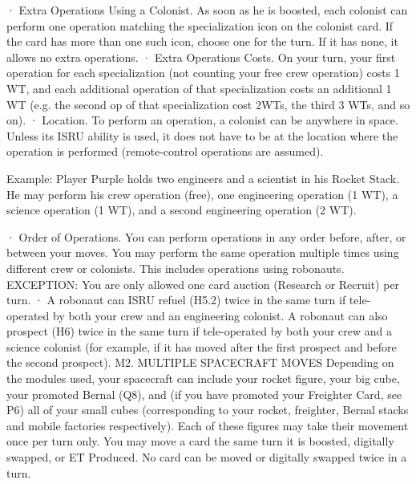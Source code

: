 \documentclass[a4paper]{book}
\begin{document}
·       Extra Operations Using a Colonist. As soon as he is boosted, each colonist can perform one operation matching the specialization icon on the colonist card. If the card has more than one such icon, choose one for the turn. If it has none, it allows no extra operations.
·       Extra Operations Costs. On your turn, your first operation for each specialization (not counting your free crew operation) costs 1 WT, and each additional operation of that specialization costs an additional 1 WT (e.g. the second op of that specialization cost 2WTs, the third 3 WTs, and so on).
·       Location. To perform an operation, a colonist can be anywhere in space. Unless its ISRU ability is used, it does not have to be at the location where the operation is performed (remote-control operations are assumed).

Example: Player Purple holds two engineers and a scientist in his Rocket Stack. He may perform his crew operation (free), one engineering operation (1 WT), a science operation (1 WT), and a second engineering operation (2 WT).

·       Order of Operations. You can perform operations in any order before, after, or between your moves. You may perform the same operation multiple times using different crew or colonists. This includes operations using robonauts.
EXCEPTION: You are only allowed one card auction (Research or Recruit) per turn.
·       A robonaut can ISRU refuel (H5.2) twice in the same turn if tele-operated by both your crew and an engineering colonist. A robonaut can also prospect (H6) twice in the same turn if tele-operated by both your crew and a science colonist (for example, if it has moved after the first prospect and before the second prospect).
M2. MULTIPLE SPACECRAFT MOVES
Depending on the modules used, your spacecraft can include your rocket figure, your big cube, your promoted Bernal (Q8), and (if you have promoted your Freighter Card, see P6) all of your small cubes (corresponding to your rocket, freighter, Bernal stacks and mobile factories respectively). Each of these figures may take their movement once per turn only.
You may move a card the same turn it is boosted, digitally swapped, or ET Produced.
No card can be moved or digitally swapped twice in a turn.
\end{document}
